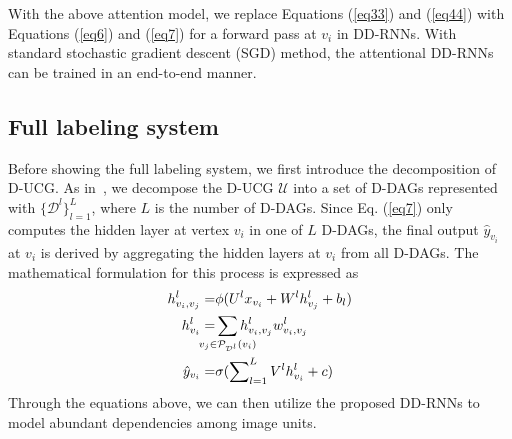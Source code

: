 \documentclass[10pt,twocolumn,letterpaper]{article}
\begin{document}

With the above attention model, we replace Equations (\ref{eq33}) and (\ref{eq44}) with Equations (\ref{eq6}) and (\ref{eq7}) for a forward pass at $v_i$ in DD-RNNs. With standard stochastic gradient descent (SGD) method, the attentional DD-RNNs can be trained in an end-to-end manner.

\subsection{Full labeling system}
\label{sec33}

Before showing the full labeling system, we first introduce the decomposition of D-UCG. As in~\cite{shuai2017scene}, we decompose the D-UCG $\mathcal{U}$ into a set of D-DAGs represented with $\{\mathcal{D}^{l}\}_{l=1}^L$, where $L$ is the number of D-DAGs. Since Eq. (\ref{eq7}) only computes the hidden layer at vertex $v_i$ in one of $L$ D-DAGs, the final output $\hat{y}_{v_i}$ at $v_i$ is derived by aggregating the hidden layers at $v_i$ from all D-DAGs. The mathematical formulation for this process is expressed as
\begin{align}
h_{v_i,v_j}^{l} = &\phi(U^{l}x_{v_i}+W^{l}h_{v_j}^{l}+b_l) \label{eq12} \\
h_{v_i}^{l} = &\sum\limits_{\mathclap{v_j\in{\mathcal{P}_{\mathcal{D}^{l}}(v_i)}}}{h_{v_i,v_j}^{l}w_{v_i,v_j}^{l}} \label{eq13}\\
\hat{y}_{v_i} = &\sigma(\sum\nolimits_{l=1}^{L}V^{l}h_{v_i}^{l}+c) \label{eq14}
\end{align}
Through the equations above, we can then utilize the proposed DD-RNNs to model abundant dependencies among image units.
\end{document}
